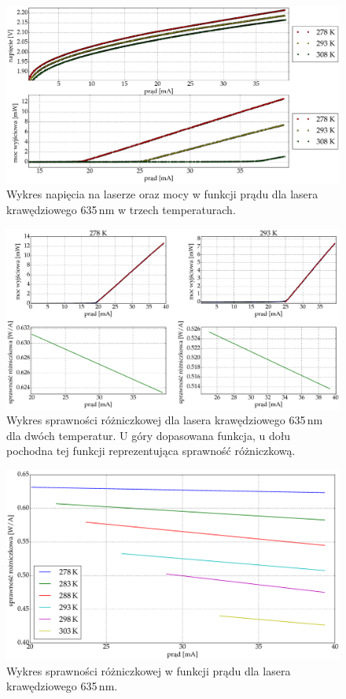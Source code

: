 \begin{figure}
\center
  \includegraphics[scale=0.30]{plot635/plot_voltage_power.eps}
  \caption{Wykres napięcia na laserze oraz mocy w funkcji prądu dla lasera krawędziowego 635\,nm w trzech temperaturach.}
    \label{fig:plot_voltage_power_635}
\end{figure}
\begin{figure}
\center
  \includegraphics[scale=0.30]{plot635/plot_eff_via_current4.eps}
  \caption{Wykres sprawności różniczkowej dla lasera krawędziowego 635\,nm dla dwóch temperatur. U góry dopasowana funkcja,
u dołu pochodna tej funkcji reprezentująca sprawność różniczkową.}
  \label{fig:plot_eff_via_current4_635}
\end{figure}
\begin{figure}
\center
  \includegraphics[scale=0.25]{plot635/plot_eff_via_current_all.eps}
  \caption{Wykres sprawności różniczkowej w funkcji prądu dla lasera krawędziowego 635\,nm.}
  \label{fig:plot_eff_via_current_all}
\end{figure}

